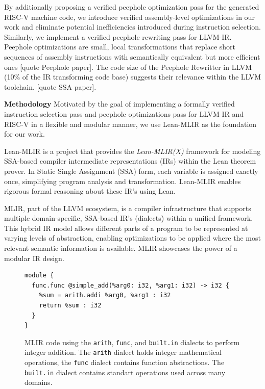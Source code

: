 By additionally proposing a verified peephole optimization pass for the generated RISC-V machine code,  we introduce verified assembly-level optimizations in our work and eliminate potential inefficiencies introduced during instruction selection. Similarly, we implement a verified peephole rewriting pass for LLVM-IR. Peephole optimizations are small, local transformations that replace short sequences of assembly instructions with semantically equivalent but more efficient ones [quote Peephole paper]. The code size of the Peephole Rewritter in LLVM (10\% of the IR transforming code base) suggests their relevance within the LLVM toolchain. [quote SSA paper].

\textbf{Methodology}
Motivated by the goal of implementing a formally verified instruction selection pass and peephole optimizations pass for LLVM IR and RISC-V in a flexible and modular manner, we use Lean-MLIR as the foundation for our work.

Lean-MLIR is a project that provides the  \textit{Lean-MLIR(X)}  framework for modeling SSA-based compiler intermediate representations (IRs) within the Lean theorem prover. In Static Single Assignment (SSA) form, each variable is assigned exactly once, simplifying program analysis and transformation. Lean-MLIR enables rigorous formal reasoning about these IR's using Lean.

MLIR, part of the LLVM ecosystem, is a compiler infrastructure that supports multiple domain-specific, SSA-based IR's (dialects) within a unified framework. This hybrid IR model allows different parts of a program to be represented at varying levels of abstraction, enabling optimizations to be applied where the most relevant semantic information is available. MLIR showcases the power of a modular IR design.

\begin{figure}[ht]
\centering
\begin{lstlisting}[language=mlir, basicstyle=\ttfamily\small]
module {
  func.func @simple_add(%arg0: i32, %arg1: i32) -> i32 {
    %sum = arith.addi %arg0, %arg1 : i32
    return %sum : i32
  }
}

\end{lstlisting}
\caption{ MLIR code using the \texttt{arith}, \texttt{func},  and \texttt{built.in} dialects to perform integer addition. The \texttt{arith} dialect holds integer mathematical operations, the \texttt{func} dialect contains function abstractions. The \texttt{built.in} dialect contains standart operations used across many domains.}
\label{fig:mlir-addition}
\end{figure}

